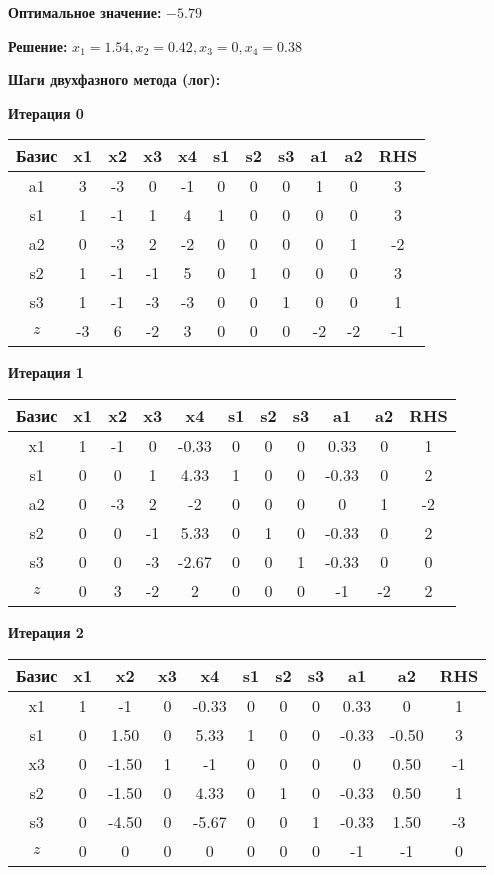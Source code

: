 \documentclass[a4paper,12pt]{article}
\begin{document}
\textbf{Оптимальное значение: }$-5.79$

\textbf{Решение: }$x_{1}=1.54, x_{2}=0.42, x_{3}=0, x_{4}=0.38$

\textbf{Шаги двухфазного метода (лог):}


 \textbf{Итерация 0}\\
\begin{tabular}{|c|c|c|c|c|c|c|c|c|c|c|}
\hline
Базис & x1 & x2 & x3 & x4 & s1 & s2 & s3 & a1 & a2 & RHS \\ \hline
a1 & 3 & -3 & 0 & -1 & 0 & 0 & 0 & 1 & 0 & 3 \\ \hline
s1 & 1 & -1 & 1 & 4 & 1 & 0 & 0 & 0 & 0 & 3 \\ \hline
a2 & 0 & -3 & 2 & -2 & 0 & 0 & 0 & 0 & 1 & -2 \\ \hline
s2 & 1 & -1 & -1 & 5 & 0 & 1 & 0 & 0 & 0 & 3 \\ \hline
s3 & 1 & -1 & -3 & -3 & 0 & 0 & 1 & 0 & 0 & 1 \\ \hline
$z$ & -3 & 6 & -2 & 3 & 0 & 0 & 0 & -2 & -2 & -1 \\ \hline
\end{tabular}
\vspace{5mm}

 \textbf{Итерация 1}\\
\begin{tabular}{|c|c|c|c|c|c|c|c|c|c|c|}
\hline
Базис & x1 & x2 & x3 & x4 & s1 & s2 & s3 & a1 & a2 & RHS \\ \hline
x1 & 1 & -1 & 0 & -0.33 & 0 & 0 & 0 & 0.33 & 0 & 1 \\ \hline
s1 & 0 & 0 & 1 & 4.33 & 1 & 0 & 0 & -0.33 & 0 & 2 \\ \hline
a2 & 0 & -3 & 2 & -2 & 0 & 0 & 0 & 0 & 1 & -2 \\ \hline
s2 & 0 & 0 & -1 & 5.33 & 0 & 1 & 0 & -0.33 & 0 & 2 \\ \hline
s3 & 0 & 0 & -3 & -2.67 & 0 & 0 & 1 & -0.33 & 0 & 0 \\ \hline
$z$ & 0 & 3 & -2 & 2 & 0 & 0 & 0 & -1 & -2 & 2 \\ \hline
\end{tabular}
\vspace{5mm}

 \textbf{Итерация 2}\\
\begin{tabular}{|c|c|c|c|c|c|c|c|c|c|c|}
\hline
Базис & x1 & x2 & x3 & x4 & s1 & s2 & s3 & a1 & a2 & RHS \\ \hline
x1 & 1 & -1 & 0 & -0.33 & 0 & 0 & 0 & 0.33 & 0 & 1 \\ \hline
s1 & 0 & 1.50 & 0 & 5.33 & 1 & 0 & 0 & -0.33 & -0.50 & 3 \\ \hline
x3 & 0 & -1.50 & 1 & -1 & 0 & 0 & 0 & 0 & 0.50 & -1 \\ \hline
s2 & 0 & -1.50 & 0 & 4.33 & 0 & 1 & 0 & -0.33 & 0.50 & 1 \\ \hline
s3 & 0 & -4.50 & 0 & -5.67 & 0 & 0 & 1 & -0.33 & 1.50 & -3 \\ \hline
$z$ & 0 & 0 & 0 & 0 & 0 & 0 & 0 & -1 & -1 & 0 \\ \hline
\end{tabular}
\vspace{5mm}
\end{document}
